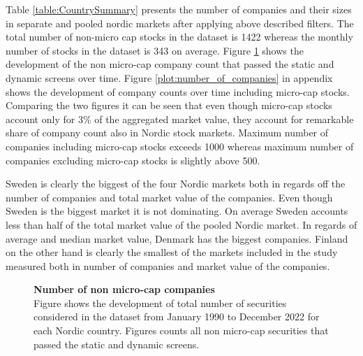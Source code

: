 \documentclass[12pt]{article}
\begin{document}
Table \ref{table:CountrySummary} presents the number of companies and their sizes in separate and pooled nordic markets after applying above described filters. The total number of non-micro cap stocks in the dataset is 1422 whereas the monthly number of stocks in the dataset is 343 on average. Figure \ref{plot:number_of_companies_wo_micro} shows the development of the non micro-cap company count that passed the static and dynamic screens over time. Figure \ref{plot:number_of_companies} in appendix shows the development of company counts over time including micro-cap stocks. Comparing the two figures it can be seen that even though micro-cap stocks account only for 3\% of the aggregated market value, they account for remarkable share of company count also in Nordic stock markets. Maximum number of companies including micro-cap stocks exceeds 1000 whereas maximum number of companies excluding micro-cap stocks is slightly above 500. \par

Sweden is clearly the biggest of the four Nordic markets both in regards off the number of companies and total market value of the companies. Even though Sweden is the biggest market it is not dominating. On average Sweden accounts less than half of the total market value of the pooled Nordic market. In regards of average  and median market value, Denmark has the biggest companies. Finland on the other hand is clearly the smallest of the markets included in the study measured both in number of companies and market value of the companies. \par

\begin{figure}[ht]
\centering
\caption[Number of non micro-cap companies]{\textbf{Number of non micro-cap companies}\\ Figure shows the development of total number of securities considered in the dataset from January 1990 to December 2022 for each Nordic country. Figures counts all non micro-cap securities that passed the static and dynamic screens.}

\label{plot:number_of_companies_wo_micro}
\end{figure}
\end{document}
